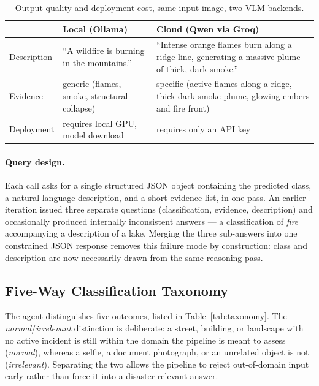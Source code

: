 \documentclass[11pt, a4paper]{article}
\begin{document}
\begin{table}[h]
\centering\small
\begin{tabular}{p{2.6cm}p{5.0cm}p{5.0cm}}
\toprule
& \textbf{Local (Ollama)} & \textbf{Cloud (Qwen via Groq)} \\
\midrule
Description  & ``A wildfire is burning in the mountains.'' &
``Intense orange flames burn along a ridge line, generating a massive plume of thick, dark
smoke.'' \\
Evidence     & generic (flames, smoke, structural collapse) &
specific (active flames along a ridge, thick dark smoke plume, glowing embers and fire front)\\
Deployment   & requires local GPU, model download & requires only an API key \\
\bottomrule
\end{tabular}
\caption{Output quality and deployment cost, same input image, two VLM backends.}
\label{tab:quality}
\end{table}

\paragraph{Query design.} Each call asks for a single structured JSON object containing the
predicted class, a natural-language description, and a short evidence list, in one pass. An
earlier iteration issued three separate questions (classification, evidence, description) and
occasionally produced internally inconsistent answers --- a classification of \emph{fire}
accompanying a description of a lake. Merging the three sub-answers into one constrained JSON
response removes this failure mode by construction: class and description are now necessarily
drawn from the same reasoning pass.

\subsection{Five-Way Classification Taxonomy}
\label{sec:taxonomy}

The agent distinguishes five outcomes, listed in Table~\ref{tab:taxonomy}. The
\emph{normal}/\emph{irrelevant} distinction is deliberate: a street, building, or landscape
with no active incident is still within the domain the pipeline is meant to assess
(\emph{normal}), whereas a selfie, a document photograph, or an unrelated object is not
(\emph{irrelevant}). Separating the two allows the pipeline to reject out-of-domain input
early rather than force it into a disaster-relevant answer.
\end{document}
